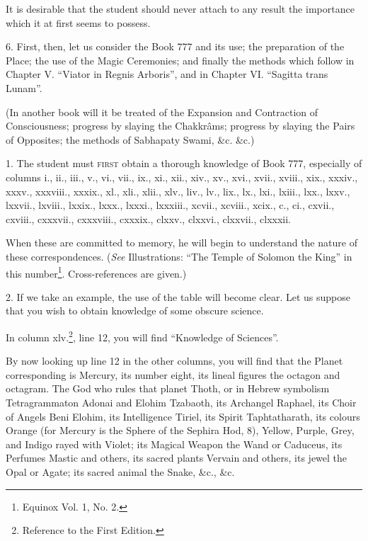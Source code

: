 It is desirable that the student should never attach to any result the importance which it at first seems to possess.

6. First, then, let us consider the Book 777 and its use; the preparation of the Place; the use of the Magic Ceremonies; and finally the methods which follow in Chapter V. \enquote{Viator in Regnis Arboris}, and in Chapter VI. \enquote{Sagitta trans Lunam}.

(In another book will it be treated of the Expansion and Contraction of Consciousness; progress by slaying the Chakkr\^{a}ms; progress by slaying the Pairs of Opposites; the methods of Sabhapaty Swami, \&c. \&c.)


1. The student must \textsc{first} obtain a thorough knowledge of Book 777, especially of columns i., ii., iii., v., vi., vii., ix., xi., xii., xiv., xv., xvi., xvii., xviii., xix., xxxiv., xxxv., xxxviii., xxxix., xl., xli., xlii., xlv., liv., lv., lix., lx., lxi., lxiii., lxx., lxxv., lxxvii., lxviii., lxxix., lxxx., lxxxi., lxxxiii., xcvii., xcviii., xcix., c., ci., cxvii., cxviii., cxxxvii., cxxxviii., cxxxix., clxxv., clxxvi., clxxvii., clxxxii.

When these are committed to memory, he will begin to understand the nature of these correspondences. (\textit{See} Illustrations: \enquote{The Temple of Solomon the King} in this number\footnote{Equinox Vol. 1, No. 2.}. Cross-references are given.)

2. If we take an example, the use of the table will become clear. Let us suppose that you wish to obtain knowledge of some obscure science.

In column xlv.\footnote{Reference to the First Edition.}, line 12, you will find \enquote{Knowledge of Sciences}.

By now looking up line 12 in the other columns, you will find that the Planet corresponding is Mercury, its number eight, its lineal figures the octagon and octagram. The God who rules that planet Thoth, or in Hebrew symbolism Tetragrammaton Adonai and Elohim Tzabaoth, its Archangel Raphael, its Choir of Angels Beni Elohim, its Intelligence Tiriel, its Spirit Taphtatharath, its colours Orange (for Mercury is the Sphere of the Sephira Hod, 8), Yellow, Purple, Grey, and Indigo rayed with Violet; its Magical Weapon the Wand or Caduceus, its Perfumes Mastic and others, its sacred plants Vervain and others, its jewel the Opal or Agate; its sacred animal the Snake, \&c., \&c.

